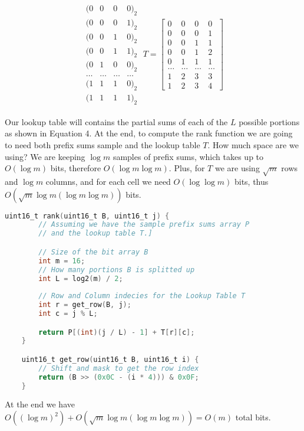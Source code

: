 \documentclass{article}
\begin{document}
\begin{align}
     \begin{matrix}
         (0 & 0 & 0 & 0)_2 \\
         (0 & 0 & 0 & 1)_2 \\
         (0 & 0 & 1 & 0)_2 \\
         (0 & 0 & 1 & 1)_2 \\
         (0 & 1 & 0 & 0)_2 \\
         \dots & \dots & \dots & \dots \\
         (1 & 1 & 1 & 0)_2 \\
         (1 & 1 & 1 & 1)_2
     \end{matrix} \;
     T = 
     \begin{bmatrix}
        0 & 0 & 0 & 0 \\
        0 & 0 & 0 & 1 \\
        0 & 0 & 1 & 1 \\
        0 & 0 & 1 & 2 \\
        0 & 1 & 1 & 1 \\
        \dots & \dots & \dots & \dots \\
        1 & 2 & 3 & 3 \\
        1 & 2 & 3 & 4
    \end{bmatrix} 
\end{align}

\noindent Our lookup table will contains the partial sums of each of the $L$ possible portions as shown in Equation 4. At the end, to compute the rank function we are going to need
both prefix sums sample and the lookup table $T$. How much space are we using? We are keeping $\log m$ samples of prefix sums, which takes up to $O(\log m)$ bits, therefore $O(\log m \log m)$.
Plus, for $T$ we are using $\sqrt m$ rows and $\log m$ columns, and for each cell we need $O(\log \log m)$ bits, thus $O(\sqrt{m}\log m (\log m \log m))$ bits.

\begin{lstlisting}[language=C,caption=`Rank function implemented using a bit array of 16 elements.']
    uint16_t rank(uint16_t B, uint16_t j) {
        // Assuming we have the sample prefix sums array P
        // and the lookup table T.]

        // Size of the bit array B
        int m = 16; 
        // How many portions B is splitted up
        int L = log2(m) / 2;
        
        // Row and Column indecies for the Lookup Table T
        int r = get_row(B, j);
        int c = j % L;

        return P[(int)(j / L) - 1] + T[r][c];
    }

    uint16_t get_row(uint16_t B, uint16_t i) {
        // Shift and mask to get the row index
        return (B >> (0x0C - (i * 4))) & 0x0F;
    }
\end{lstlisting}

\noindent At the end we have $O((\log m)^2) + O(\sqrt{m}\log m (\log m \log m)) = O(m)$ total bits.
\end{document}
